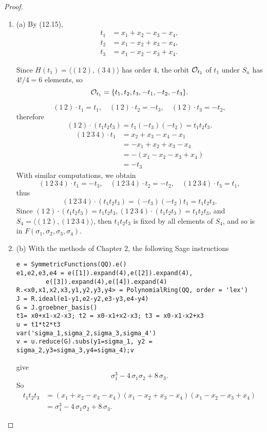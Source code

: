 \documentclass[11pt,a4paper]{article}
\newcommand{\be} {\begin{enumerate}}
\newcommand{\ee} {\end{enumerate}}
\begin{document}
\begin{proof}
\be
\item[(a)] By (12.15),
\begin{align*}
t_1 &= x_1+x_2-x_3-x_4,\\
t_2 &= x_1-x_2+x_3-x_4,\\
t_3 &= x_1-x_2-x_3+x_4.
\end{align*}

Since $H(t_1) = \langle (1\,2),(3\,4) \rangle$ has order 4, the orbit ${\cal O}_{t_1}$ of $t_1$ under $S_n$ has $4!/4 = 6$ elements, so $${\cal O}_{t_1} =  \{t_1,t_2,t_3,-t_1,-t_2,-t_3\}.$$

$$(1 \,2) \cdot t_1 = t_1, \quad (1 \,2) \cdot t_2 = -t_3, \quad (1 \,2) \cdot t_3 = -t_2,$$
therefore 
$$(1 \,2) \cdot (t_1t_2t_3) = t_1(-t_3)(-t_2) = t_1t_2t_3.$$
\begin{align*}
(1 \,2 \, 3 \, 4) \cdot t_1 &= x_2+x_3-x_4-x_1\\
&=-x_1+x_2+x_3-x_4\\
&=-(x_1-x_2-x_3+x_4)\\
&=-t_3
\end{align*}
With similar computations, we obtain
$$(1 \,2 \, 3 \, 4) \cdot t_1 = -t_3, \quad (1 \,2 \, 3 \, 4)\cdot t_2 = -t_2, \quad (1 \,2 \, 3 \, 4)\cdot t_3 = t_1,$$
thus
$$ (1 \,2 \, 3 \, 4) \cdot (t_1t_2t_3) = (-t_3)(-t_2)t_1 = t_1t_2t_3.$$
Since $(1 \,2) \cdot (t_1t_2t_3)  = t_1t_2t_3, (1 \,2 \, 3 \, 4) \cdot (t_1t_2t_3) = t_1t_2t_3$, and $S_4 = \langle (1 \,2), (1 \,2 \, 3 \, 4) \rangle$, then $t_1t_2t_3$ is fixed by all elements of $S_4$, and so is in $F(\sigma_1,\sigma_2,\sigma_3,\sigma_4)$.

\item[(b)] With the methods of Chapter 2, the following Sage instructions
\begin{verbatim}
e = SymmetricFunctions(QQ).e()
e1,e2,e3,e4 = e([1]).expand(4),e([2]).expand(4),
        e([3]).expand(4),e([4]).expand(4)
R.<x0,x1,x2,x3,y1,y2,y3,y4> = PolynomialRing(QQ, order = 'lex')
J = R.ideal(e1-y1,e2-y2,e3-y3,e4-y4)
G = J.groebner_basis()
t1= x0+x1-x2-x3; t2 = x0-x1+x2-x3; t3 = x0-x1-x2+x3
u = t1*t2*t3
var('sigma_1,sigma_2,sigma_3,sigma_4')
v = u.reduce(G).subs(y1=sigma_1, y2 = sigma_2,y3=sigma_3,y4=sigma_4);v
\end{verbatim}
give
$$\sigma_{1}^{3} - 4 \, \sigma_{1} \sigma_{2} + 8 \, \sigma_{3}.
$$
So
\begin{align*}
t_1t_2t_3 &= (x_1+x_2-x_3-x_4)(x_1-x_2+x_3-x_4)( x_1-x_2-x_3+x_4)\\
& = \sigma_{1}^{3} - 4 \, \sigma_{1} \sigma_{2} + 8 \, \sigma_{3}.
\end{align*}
\ee
\end{proof}
\end{document}
